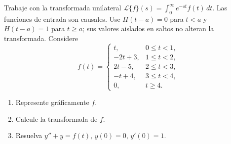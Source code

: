 Trabaje con la transformada unilateral $\mathcal L\{f\}(s)=\int_0^\infty e^{-st}f(t)\,dt$. Las funciones de entrada son causales. Use $H(t-a)=0$ para $t<a$ y $H(t-a)=1$ para $t\ge a$; sus valores aislados en saltos no alteran la transformada. Considere
\[f(t)=\begin{cases}t,&0\le t<1,\\-2t+3,&1\le t<2,\\2t-5,&2\le t<3,\\-t+4,&3\le t<4,\\0,&t\ge4.\end{cases}\]

\begin{enumerate}[label=(\alph*),ref=\alph*,leftmargin=*]
\item Represente gráficamente $f$.
\item Calcule la transformada de $f$.
\item Resuelva $y''+y=f(t)$, $y(0)=0$, $y'(0)=1$.
\end{enumerate}
